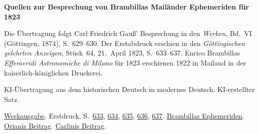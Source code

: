 \clearpage\thispagestyle{empty}
\begin{center}\Large\bfseries Quellen zur Besprechung von Brambillas Mailänder Ephemeriden für 1823\end{center}

Die Übertragung folgt Carl Friedrich Gauß’ Besprechung in den \emph{Werken}, Bd.~VI (Göttingen, 1874), S.~629--630. Der Erstabdruck erschien in den \emph{Göttingischen gelehrten Anzeigen}, Stück~64, 21.~April 1823, S.~633--637. Enrico Brambillas \emph{Effemeridi Astronomiche di Milano} für 1823 erschienen 1822 in Mailand in der kaiserlich-königlichen Druckerei.

KI-Übertragung aus dem historischen Deutsch in modernes Deutsch. KI-erstellter Satz.

\href{https://gdz.sub.uni-goettingen.de/id/PPN236007467}{Werkausgabe}. Erstdruck, S.~\href{https://images.p.sub.uni-goettingen.de/iiif/image/gdz:PPN385030444_1823_1:00000639/full/1650,/0/default.jpg}{633}, \href{https://images.p.sub.uni-goettingen.de/iiif/image/gdz:PPN385030444_1823_1:00000640/full/1650,/0/default.jpg}{634}, \href{https://images.p.sub.uni-goettingen.de/iiif/image/gdz:PPN385030444_1823_1:00000641/full/1650,/0/default.jpg}{635}, \href{https://images.p.sub.uni-goettingen.de/iiif/image/gdz:PPN385030444_1823_1:00000642/full/1650,/0/default.jpg}{636}, \href{https://images.p.sub.uni-goettingen.de/iiif/image/gdz:PPN385030444_1823_1:00000643/full/1650,/0/default.jpg}{637}. \href{https://books.google.it/books?id=yKIAAAAAMAAJ&pg=PP5}{Brambillas Ephemeriden}. \href{https://books.google.it/books?id=yKIAAAAAMAAJ&pg=RA1-PA3}{Orianis Beitrag}. \href{https://books.google.it/books?id=yKIAAAAAMAAJ&pg=RA1-PA27}{Carlinis Beitrag}.

\clearpage
